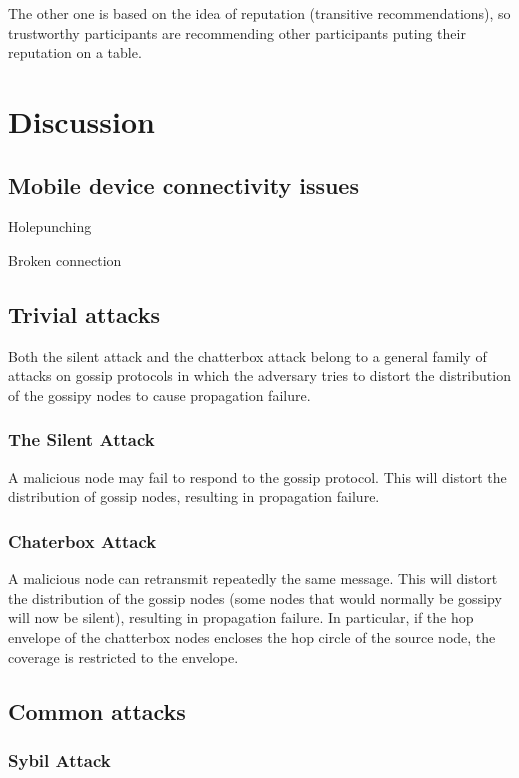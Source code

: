 \documentclass{article}
\begin{document}
The other one is based on the idea of reputation (transitive recommendations), so trustworthy participants are recommending other participants puting their reputation on a table.

\section{Discussion}

\subsection{Mobile device connectivity issues}

Holepunching

Broken connection

\subsection{Trivial attacks}

Both the silent attack and the chatterbox attack belong to a general family of attacks on
gossip protocols in which the adversary tries to distort the distribution of the gossipy nodes to
cause propagation failure.

\subsubsection{The Silent Attack}

A malicious node may fail to respond to the gossip protocol. This will
distort the distribution of gossip nodes, resulting in propagation failure.

\subsubsection{Chaterbox Attack}

A malicious node can retransmit repeatedly the same message. This
will distort the distribution of the gossip nodes (some nodes that would normally be gossipy
will now be silent), resulting in propagation failure. In particular, if the hop envelope of the
chatterbox nodes encloses the hop circle of the source node, the coverage is restricted to the
envelope.

\subsection{Common attacks}

\subsubsection{Sybil Attack}
\end{document}
